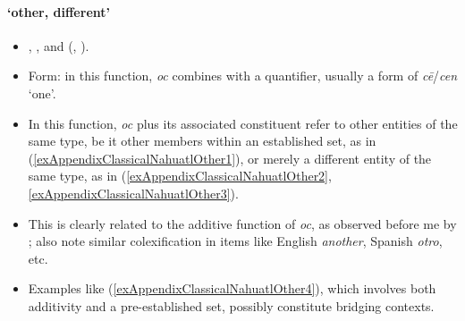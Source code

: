 \paragraph{\lq other, different'}\label{appendixClassicalNahuatlOther}
\begin{itemize}
	\item \textcite[318]{Andrews2003}, \textcite[247]{Bierhorst1985}, \textcite[175–176]{Karttunen1992} and \citeauthor{Launey1986} (\citeyear[1266–1267]{Launey1986}, \citeyear[66]{LauneyMackay2011}).
	\item Form: in this function, \textit{oc} combines with a quantifier, usually a form of \textit{cē}/\textit{cen} \lq one'.
	\item In this function, \textit{oc} plus its associated constituent refer to other entities of the same type, be it other members within an established set, as in (\ref{exAppendixClassicalNahuatlOther1}), or merely a different entity of the same type, as in (\ref{exAppendixClassicalNahuatlOther2}, \ref{exAppendixClassicalNahuatlOther3}).
	\item This is clearly related to the additive function of \textit{oc}, as observed before me by \textcite[1266]{Launey1986}; also note similar colexification in items like English \textit{another}, Spanish \textit{otro}, etc.
	\item Examples like (\ref{exAppendixClassicalNahuatlOther4}), which involves both additivity and a pre-established set, possibly constitute bridging contexts.
	
\end{itemize}
